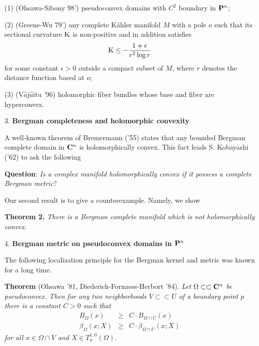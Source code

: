 \documentclass[12pt]{article}
\begin{document}
(1) (Ohsawa-Sibony 98') pseudoconvex domains with $C^2$ boundary
in ${\bf P}^n$;

(2) (Greene-Wu 79') any complete K\"ahler manifold $M$ with a pole
$o$ such that its sectional curvature ${\rm K}$ is non-positive
and in addition satisfies
$$
{\rm K}\le -\frac{1+\epsilon}{r^2\log r}
$$
for some constant $\epsilon>0$ outside a compact subset of $M$,
where $r$ denotes the distance function based at $o$;

(3) (V$\hat{a}$j$\hat{a}$itu '96) holomorphic fiber bundles whose
base and fiber are hyperconvex.

\bigskip

3. \textbf{Bergman completeness and holomorphic convexity}.

\bigskip

A well-known theorem of Bremermann ('55) states that any bounded
Bergman complete domain in ${\bf C}^n$ is holomorphically convex.
This fact leads S. Kobayashi ('62) to ask the following

\bigskip

\textbf{Question}: \emph{Is a complex manifold holomorphically
convex if it possess a complete Bergman metric}?

\bigskip

Our second result is to give a counterexample. Namely, we show

\bigskip

\textbf{Theorem 2.} \emph{There is a Bergman complete manifold
which is not holomorphically convex}.

\bigskip

4. \textbf{Bergman metric on pseudoconvex domains in ${\bf P}^n$}

\bigskip

The following localization principle for the Bergman kernel and
metric was known for a long time.

\bigskip

\textbf{Theorem} (Ohsawa '81, Diederich-Fornaess-Herbort '84).
\emph{Let $\Omega\subset\subset {\bf C}^n$ be pseudoconvex. Then
for any two neighborhoods $V\subset\subset U$ of a boundary point
$p$ there is a constant $C>0$ such that }
\begin{eqnarray*}
B_\Omega(x) & \ge & C \cdot B_{\Omega\cap U
}(x)\\
\beta_\Omega(x;X) & \ge & C\cdot \beta_{\Omega\cap U }(x;X)
\end{eqnarray*}
\emph{for all $x\in \Omega\cap V$ and $X\in T^{1,0}_x(\Omega)$}.
\end{document}
